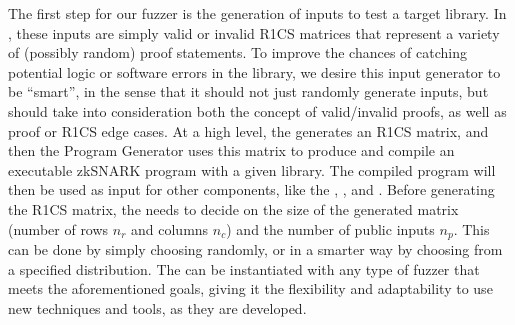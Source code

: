 %
The first step for our fuzzer is the generation of inputs to test a target library.  In \SnarkFuzzer, these inputs are simply valid or invalid R1CS matrices that represent a variety of (possibly random) proof statements.  To improve the chances of catching potential logic or software errors in the library, we desire this input generator to be ``smart'', in the sense that it should not just randomly generate inputs, but should take into consideration both the concept of valid/invalid proofs, as well as proof or R1CS edge cases.
At a high level, the  generates an R1CS matrix, and then the Program Generator uses this matrix to produce and compile an executable zkSNARK program with a given library. The compiled program will then be used as input for other components, like the \branchmodel, , and .  Before generating the R1CS matrix, the  needs to decide on the size of the generated matrix (number of rows $n_r$ and columns $n_c$) and the number of public inputs $n_p$.  This can be done by simply choosing randomly, or in a smarter way by choosing from a specified distribution.
The  can be instantiated with any type of fuzzer that meets the aforementioned goals, giving it the flexibility and adaptability to use new techniques and tools, as they are developed.


